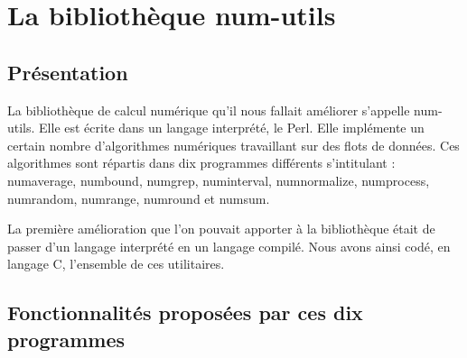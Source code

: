 \chapter{La biblioth\`eque num-utils}
\label{chap:La bibliotheque num-utils}

\section{Pr\'esentation}

La biblioth\`eque de calcul num\'erique qu'il nous fallait am\'eliorer s'appelle num-utils. Elle est \'ecrite dans un langage
interpr\'et\'e, le Perl.
Elle impl\'emente un certain nombre d'algorithmes num\'eriques travaillant sur des flots de donn\'ees.
Ces algorithmes sont r\'epartis dans dix programmes diff\'erents s'intitulant : numaverage, numbound, numgrep, numinterval, numnormalize,
numprocess, numrandom, numrange, numround et numsum.

La premi\`ere am\'elioration que l'on pouvait apporter \`a la biblioth\`eque \'etait de passer d'un langage interpr\'et\'e en un langage compil\'e.
Nous avons ainsi cod\'e, en langage C, l'ensemble de ces utilitaires.


\section{Fonctionnalit\'es propos\'ees par ces dix programmes}

